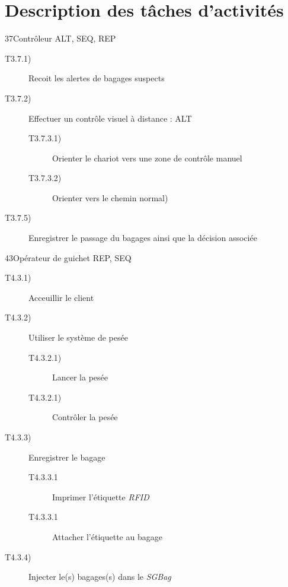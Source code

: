 \part{Description des tâches d'activités}

\dta
{3}{7}{Contrôleur}
{ALT, SEQ, REP}
{
\begin{description}
	\item [T3.7.1)] Recoit les alertes de bagages suspects
	\item [T3.7.2)] Effectuer un contrôle visuel à distance : ALT
	\begin{description}
		\item [T3.7.3.1)] Orienter le chariot vers une zone de contrôle manuel
		\item [T3.7.3.2)] Orienter vers le chemin \og normal\fg)
	\end{description}
	\item [T3.7.5)] Enregistrer le passage du bagages ainsi que la décision associée	
\end{description}
}

\dta
{4}{3}{Opérateur de guichet}
{REP, SEQ}
{
\begin{description}
	\item [T4.3.1)] Acceuillir le client
	\item [T4.3.2)] Utiliser le système de pesée
	\begin{description}
		\item [T4.3.2.1)] Lancer la pesée
		\item [T4.3.2.1)] Contrôler la pesée
	\end{description}

	\item [T4.3.3)] Enregistrer le bagage
	\begin{description}
		\item [T4.3.3.1] Imprimer l'étiquette \textsl{RFID}
		\item [T4.3.3.1] Attacher l'étiquette au bagage
	\end{description}
		
	\item [T4.3.4)] Injecter le(s) bagages(s) dans le \textsl{SGBag} 
\end{description}
}

